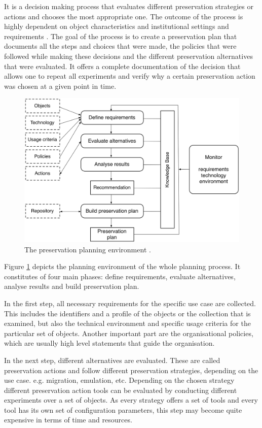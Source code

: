 It is a decision making process that evaluates different preservation strategies or actions and chooses the most appropriate one. The outcome of the process is highly dependent on object characteristics and institutional settings and requirements \cite{STR07_jcdl}. The goal of the process is to create a preservation plan that documents all the steps and choices that were made, the policies that were followed while making these decisions and the different preservation alternatives that were evaluated. It offers a complete documentation of the decision that allows one to repeat all experiments and verify why a certain preservation action was chosen at a given point in time.

\begin{figure}[th]
\begin{center}
\includegraphics[width=4.5in]{figures/related/planningenvironment.png}
\caption{The preservation planning environment \cite{Becker:2009fk}.}
\label{fig:planenv}
\end{center}
\end{figure}

Figure \ref{fig:planenv} depicts the planning environment of the whole planning process. It constitutes of four main phases: define requirements, evaluate alternatives, analyse results and build preservation plan.

In the first step, all necessary requirements for the specific use case are collected. This includes the identifiers and a profile of the objects or the collection that is examined, but also the technical environment and specific usage criteria for the particular set of objects. Another important part are the organisational policies, which are usually high level statements that guide the organisation.

In the next step, different alternatives are evaluated. These are called preservation actions and follow different preservation strategies, depending on the use case. e.g. migration, emulation, etc. Depending on the chosen
strategy different preservation action tools can be evaluated by conducting different experiments over a set of objects. As every strategy offers a set of tools and every tool has its own set of configuration parameters, this step may become quite expensive in terms of time and resources.

